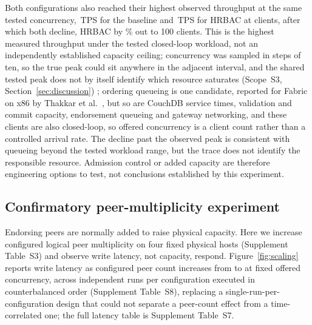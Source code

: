 \documentclass[a4paper,fleqn]{cas-sc}
\begin{document}
Both configurations also reached their highest observed throughput at the
same tested concurrency, \PeakBaselineTPS\,TPS for the baseline and
\PeakHrbacTPS\,TPS for HRBAC at \KneeClients{} clients, after which both
decline, HRBAC by \PostKneeDeclinePct\% out to 100 clients. This is the
highest measured throughput under the tested closed-loop workload, not an
independently established capacity ceiling; concurrency was sampled in
steps of ten, so the true peak could sit anywhere in the adjacent
interval, and the shared tested peak does not by itself identify which
resource saturates (Scope~S3, Section~\ref{sec:discussion}) ;
ordering queueing is one candidate, reported for Fabric on x86 by
Thakkar et al.~\cite{thakkar2018performance}, but so are CouchDB service
times, validation and commit capacity, endorsement queueing and gateway
networking, and these clients are also closed-loop, so offered
concurrency is a client count rather than a controlled arrival rate. The
decline past the observed peak is consistent with queueing beyond the
tested workload range, but the trace does not identify the responsible
resource. Admission control or added capacity are therefore engineering
options to test, not conclusions established by this experiment.

\subsection{Confirmatory peer-multiplicity experiment}
\label{subsec:scaling}

Endorsing peers are normally added to raise physical capacity. Here we
increase configured logical peer multiplicity on four fixed physical
hosts (Supplement Table~S3) and observe write latency, not capacity,
respond. Figure~\ref{fig:scaling} reports write latency as configured peer
count increases from \ScaleMinPeers{} to \ScaleMaxPeers{} at fixed offered
concurrency, across \PartRunsPerConfig{} independent runs per configuration
executed in counterbalanced order (Supplement Table~S8), replacing a
  single-run-per-configuration design that could not separate a peer-count
  effect from a time-correlated one; the
full latency table is Supplement Table~S7.
\end{document}
